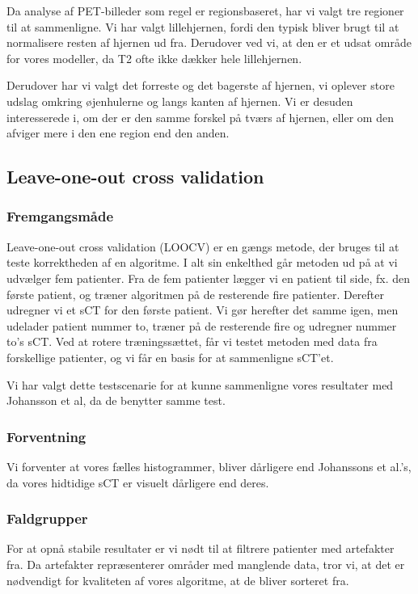 Da analyse af PET-billeder som regel er regionsbaseret, har vi valgt tre
regioner til at sammenligne. Vi har valgt lillehjernen, fordi den
typisk bliver brugt til at normalisere resten af hjernen ud fra. Derudover ved vi, at den er
et udsat område for vores modeller, da T2 ofte ikke dækker hele
lillehjernen. 

Derudover har vi valgt det forreste og det bagerste af hjernen, vi
oplever store udslag omkring øjenhulerne og langs kanten af hjernen. Vi
er desuden interesserede i, om der er den samme forskel på tværs af
hjernen, eller om den afviger mere i den ene region end den anden.

\subsection{Leave-one-out cross validation}
\subsubsection{Fremgangsmåde}

Leave-one-out cross validation (LOOCV) er en gængs metode, der bruges til
at teste korrektheden af en algoritme. I alt sin enkelthed går metoden
ud på at vi udvælger fem patienter. Fra de fem patienter lægger vi en
patient til side, fx. den første patient, og træner algoritmen på de
resterende fire patienter. Derefter udregner vi et sCT for den første
patient. Vi gør herefter det samme igen, men udelader patient nummer to,
træner på de resterende fire og udregner nummer to's sCT.  Ved at
rotere træningssættet, får vi testet metoden med data fra forskellige
patienter, og vi får en basis for at sammenligne sCT'et.

Vi har valgt dette testscenarie for at kunne sammenligne vores resultater med Johansson et al, da de benytter samme test.

\subsubsection{Forventning}
Vi forventer at vores fælles histogrammer, bliver dårligere end Johanssons et al.'s, da vores hidtidige sCT er visuelt dårligere end deres.


\subsubsection{Faldgrupper}
For at opnå stabile resultater er vi nødt til at filtrere patienter med artefakter fra. Da artefakter repræsenterer områder med manglende data, tror vi, at det er nødvendigt for kvaliteten af vores algoritme, at de bliver sorteret fra.

